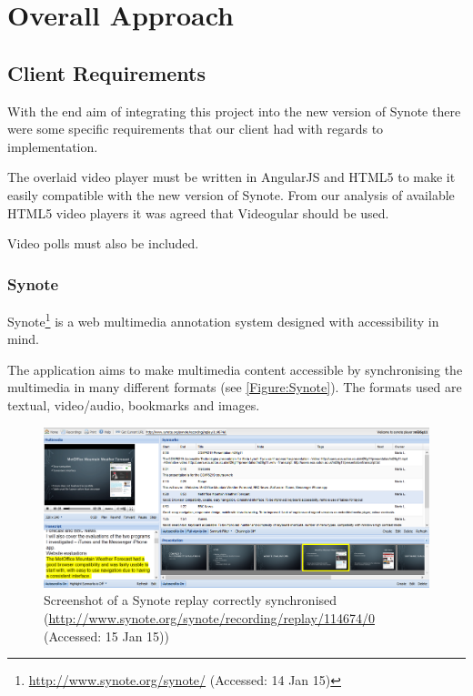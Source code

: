 \chapter{Overall Approach} 
\label{Chapter:Overall Approach}
\section{Client Requirements}
With the end aim of integrating this project into the new version of Synote there were some specific requirements that our client had with regards to implementation.

The overlaid video player must be written in AngularJS and HTML5 to make it easily compatible with the new version of Synote. From our analysis of available HTML5 video players it was agreed that \gls{Videogular} should be used.

Video polls must also be included.

\subsection{Synote}
\label{Section:Synote}
Synote\footnote{\url{http://www.synote.org/synote/} (Accessed: 14 Jan 15)} is a web multimedia annotation system designed with accessibility in mind. 

The application aims to make multimedia content accessible by synchronising the multimedia in many different formats (see \autoref{Figure:Synote}). The formats used are textual, video/audio, bookmarks and images. 

\begin{figure}[h!]
	\centering 
		\includegraphics[scale=0.4]{../figures/synote_sync.png} 		
	\caption{\label{Figure:Synote} Screenshot of a Synote replay correctly synchronised (\url{http://www.synote.org/synote/recording/replay/114674/0} (Accessed: 15 Jan 15))}
\end{figure}

